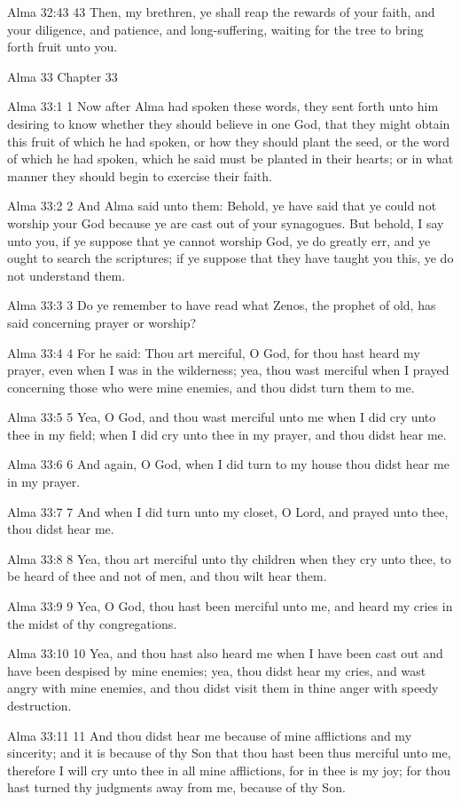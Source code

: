 Alma 32:43
 43 Then, my brethren, ye shall reap the rewards of your faith,
and your diligence, and patience, and long-suffering, waiting for
the tree to bring forth fruit unto you.

Alma 33
Chapter 33

Alma 33:1
 1 Now after Alma had spoken these words, they sent forth unto
him desiring to know whether they should believe in one God, that
they might obtain this fruit of which he had spoken, or how they
should plant the seed, or the word of which he had spoken, which
he said must be planted in their hearts; or in what manner they
should begin to exercise their faith.

Alma 33:2
 2 And Alma said unto them: Behold, ye have said that ye could
not worship your God because ye are cast out of your synagogues.
But behold, I say unto you, if ye suppose that ye cannot worship
God, ye do greatly err, and ye ought to search the scriptures; if
ye suppose that they have taught you this, ye do not understand
them.

Alma 33:3
 3 Do ye remember to have read what Zenos, the prophet of old,
has said concerning prayer or worship?

Alma 33:4
 4 For he said: Thou art merciful, O God, for thou hast heard my
prayer, even when I was in the wilderness; yea, thou wast
merciful when I prayed concerning those who were mine enemies,
and thou didst turn them to me.

Alma 33:5
 5 Yea, O God, and thou wast merciful unto me when I did cry unto
thee in my field; when I did cry unto thee in my prayer, and thou
didst hear me.

Alma 33:6
 6 And again, O God, when I did turn to my house thou didst hear
me in my prayer.

Alma 33:7
 7 And when I did turn unto my closet, O Lord, and prayed unto
thee, thou didst hear me.

Alma 33:8
 8 Yea, thou art merciful unto thy children when they cry unto
thee, to be heard of thee and not of men, and thou wilt hear
them.

Alma 33:9
 9 Yea, O God, thou hast been merciful unto me, and heard my
cries in the midst of thy congregations.

Alma 33:10
 10 Yea, and thou hast also heard me when I have been cast out
and have been despised by mine enemies; yea, thou didst hear my
cries, and wast angry with mine enemies, and thou didst visit
them in thine anger with speedy destruction.

Alma 33:11
 11 And thou didst hear me because of mine afflictions and my
sincerity; and it is because of thy Son that thou hast been thus
merciful unto me, therefore I will cry unto thee in all mine
afflictions, for in thee is my joy; for thou hast turned thy
judgments away from me, because of thy Son.

